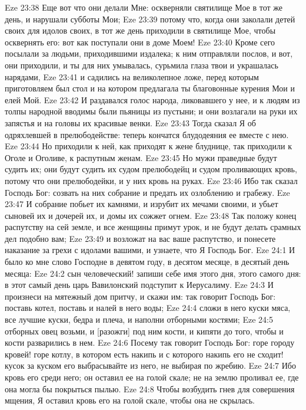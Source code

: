 Eze 23:38  Еще вот что они делали Мне: оскверняли святилище Мое в тот же день, и нарушали субботы Мои;
Eze 23:39  потому что, когда они заколали детей своих для идолов своих, в тот же день приходили в святилище Мое, чтобы осквернять его: вот как поступали они в доме Моем!
Eze 23:40  Кроме сего посылали за людьми, приходившими издалека; к ним отправляли послов, и вот, они приходили, и ты для них умывалась, сурьмила глаза твои и украшалась нарядами,
Eze 23:41  и садились на великолепное ложе, перед которым приготовляем был стол и на котором предлагала ты благовонные курения Мои и елей Мой.
Eze 23:42  И раздавался голос народа, ликовавшего у нее, и к людям из толпы народной вводимы были пьяницы из пустыни; и они возлагали на руки их запястья и на головы их красивые венки.
Eze 23:43  Тогда сказал Я об одряхлевшей в прелюбодействе: теперь кончатся блудодеяния ее вместе с нею.
Eze 23:44  Но приходили к ней, как приходят к жене блуднице, так приходили к Оголе и Оголиве, к распутным женам.
Eze 23:45  Но мужи праведные будут судить их; они будут судить их судом прелюбодейц и судом проливающих кровь, потому что они прелюбодейки, и у них кровь на руках.
Eze 23:46  Ибо так сказал Господь Бог: созвать на них собрание и предать их озлоблению и грабежу.
Eze 23:47  И собрание побьет их камнями, и изрубит их мечами своими, и убьет сыновей их и дочерей их, и домы их сожжет огнем.
Eze 23:48  Так положу конец распутству на сей земле, и все женщины примут урок, и не будут делать срамных дел подобно вам;
Eze 23:49  и возложат на вас ваше распутство, и понесете наказание за грехи с идолами вашими, и узнаете, что Я Господь Бог.
Eze 24:1  И было ко мне слово Господне в девятом году, в десятом месяце, в десятый день месяца:
Eze 24:2  сын человеческий! запиши себе имя этого дня, этого самого дня: в этот самый день царь Вавилонский подступит к Иерусалиму.
Eze 24:3  И произнеси на мятежный дом притчу, и скажи им: так говорит Господь Бог: поставь котел, поставь и налей в него воды;
Eze 24:4  сложи в него куски мяса, все лучшие куски, бедра и плеча, и наполни отборными костями;
Eze 24:5  отборных овец возьми, и [разожги] под ним кости, и кипяти до того, чтобы и кости разварились в нем.
Eze 24:6  Посему так говорит Господь Бог: горе городу кровей! горе котлу, в котором есть накипь и с которого накипь его не сходит! кусок за куском его выбрасывайте из него, не выбирая по жребию.
Eze 24:7  Ибо кровь его среди него; он оставил ее на голой скале; не на землю проливал ее, где она могла бы покрыться пылью.
Eze 24:8  Чтобы возбудить гнев для совершения мщения, Я оставил кровь его на голой скале, чтобы она не скрылась.
